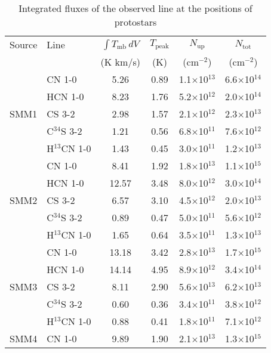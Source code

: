 \documentclass{aa}
\begin{document}
\begin{table*}
\caption{Integrated fluxes of the observed line at the positions of protostars}             %
\label{table:fluxes}      %
\centering                          %
\begin{tabular}{l l c c c c} 
\hline\hline 
Source & Line & $\int{T_{\mathrm{mb}} \, dV}$ & $T_\mathrm{peak}$ & $N_\mathrm{up}$ & $N_\mathrm{tot}$\\
 &  & (K km/s) & (K) & (cm$^{-2}$) & (cm$^{-2}$) \\
\hline  
\multirow{5}{*}{SMM1} & CN 1-0 & 5.26 & 0.89 & 1.1$\times$10$^{13}$ & 6.6$\times$10$^{14}$\\
{} & HCN 1-0 & 8.23 & 1.76 & 5.2$\times$10$^{12}$ & 2.0$\times$10$^{14}$\\ 
{} & CS 3-2 & 2.98 & 1.57 & 2.1$\times$10$^{12}$ & 2.3$\times$10$^{13}$\\  
{} & C$^{34}$S 3-2 & 1.21 & 0.56 & 6.8$\times$10$^{11}$ & 7.6$\times$10$^{12}$\\ 
{} & H$^{13}$CN 1-0 & 1.43 & 0.45 & 3.0$\times$10$^{11}$ & 1.2$\times$10$^{13}$\\ 
\hline
\multirow{5}{*}{SMM2} & CN 1-0 & 8.41 & 1.92 & 1.8$\times$10$^{13}$ & 1.1$\times$10$^{15}$ \\
{} & HCN 1-0 & 12.57 & 3.48 & 8.0$\times$10$^{12}$ & 3.0$\times$10$^{14}$\\ 
{} & CS 3-2 & 6.57 & 3.10 & 4.5$\times$10$^{12}$ & 2.0$\times$10$^{13}$\\  
{} & C$^{34}$S 3-2 & 0.89 & 0.47 & 5.0$\times$10$^{11}$ & 5.6$\times$10$^{12}$\\
{} & H$^{13}$CN 1-0 & 1.65 & 0.64 & 3.5$\times$10$^{11}$ & 1.3$\times$10$^{13}$\\ 
\hline
\multirow{5}{*}{SMM3} & CN 1-0 & 13.18 & 3.42 & 2.8$\times$10$^{13}$ & 1.7$\times$10$^{15}$\\
{} & HCN 1-0 & 14.14 & 4.95 & 8.9$\times$10$^{12}$ & 3.4$\times$10$^{14}$\\ 
{} & CS 3-2 & 8.11 & 2.90 & 5.6$\times$10$^{13}$ & 6.2$\times$10$^{13}$\\  
{} & C$^{34}$S 3-2 & 0.60 & 0.36 & 3.4$\times$10$^{11}$ & 3.8$\times$10$^{12}$\\ 
{} & H$^{13}$CN 1-0 & 0.88 & 0.41 & 1.8$\times$10$^{11}$ & 7.1$\times$10$^{12}$\\ 
\hline
\multirow{5}{*}{SMM4} & CN 1-0 & 9.89 & 1.90 & 2.1$\times$10$^{13}$ & 1.3$\times$10$^{15}$\\

\end{tabular}
\end{table*}
\end{document}

